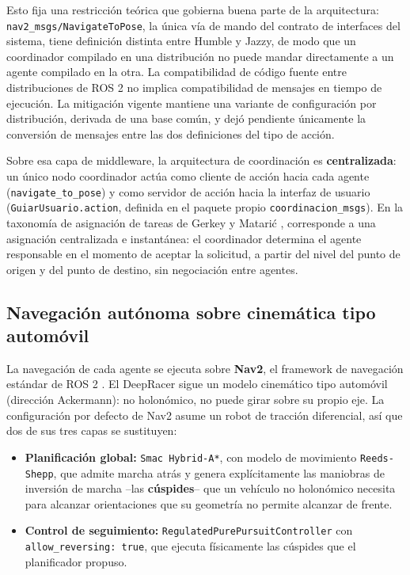 \documentclass[12pt,letterpaper]{article}
\begin{document}
Esto fija una restricción teórica que gobierna buena parte de la arquitectura: \texttt{nav2\_msgs/NavigateToPose}, la única vía de mando del contrato de interfaces del sistema, tiene definición distinta entre Humble y Jazzy, de modo que un coordinador compilado en una distribución no puede mandar directamente a un agente compilado en la otra. La compatibilidad de código fuente entre distribuciones de ROS 2 no implica compatibilidad de mensajes en tiempo de ejecución. La mitigación vigente mantiene una variante de configuración por distribución, derivada de una base común, y dejó pendiente únicamente la conversión de mensajes entre las dos definiciones del tipo de acción.

Sobre esa capa de middleware, la arquitectura de coordinación es \textbf{centralizada}: un único nodo coordinador actúa como cliente de acción hacia cada agente (\texttt{navigate\_to\_pose}) y como servidor de acción hacia la interfaz de usuario (\texttt{GuiarUsuario.action}, definida en el paquete propio \texttt{coordinacion\_msgs}). En la taxonomía de asignación de tareas de Gerkey y Matarić \cite{gerkey_taxonomy}, corresponde a una asignación centralizada e instantánea: el coordinador determina el agente responsable en el momento de aceptar la solicitud, a partir del nivel del punto de origen y del punto de destino, sin negociación entre agentes.

\subsection{Navegación autónoma sobre cinemática tipo automóvil}

La navegación de cada agente se ejecuta sobre \textbf{Nav2}, el framework de navegación estándar de ROS 2 \cite{sojan_autonomous_navigator}. El DeepRacer sigue un modelo cinemático tipo automóvil (dirección Ackermann): no holonómico, no puede girar sobre su propio eje. La configuración por defecto de Nav2 asume un robot de tracción diferencial, así que dos de sus tres capas se sustituyen:

\begin{itemize}[leftmargin=*]
    \item \textbf{Planificación global:} \texttt{Smac Hybrid-A*}, con modelo de movimiento \texttt{Reeds-Shepp}, que admite marcha atrás y genera explícitamente las maniobras de inversión de marcha --las \textbf{cúspides}-- que un vehículo no holonómico necesita para alcanzar orientaciones que su geometría no permite alcanzar de frente.
    \item \textbf{Control de seguimiento:} \texttt{RegulatedPurePursuitController} con \texttt{allow\_reversing: true}, que ejecuta físicamente las cúspides que el planificador propuso.
\end{itemize}
\end{document}
